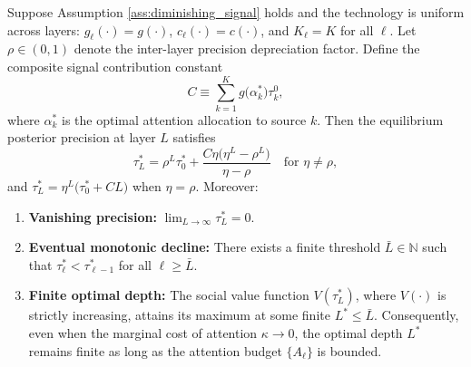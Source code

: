 
\begin{proposition}\label{prop:finite_depth}
Suppose Assumption \ref{ass:diminishing_signal} holds and the technology is uniform across layers: $g_{\ell}(\cdot) = g(\cdot)$, $c_{\ell}(\cdot) = c(\cdot)$, and $K_{\ell} = K$ for all $\ell$. Let $\rho \in (0,1)$ denote the inter-layer precision depreciation factor. Define the composite signal contribution constant
\begin{equation}\label{eq:C_constant}
C \equiv \sum_{k=1}^{K} g\bigl(\alpha^{*}_{k}\bigr) \tau^{0}_{k},
\end{equation}
where $\alpha^{*}_{k}$ is the optimal attention allocation to source $k$. Then the equilibrium posterior precision at layer $L$ satisfies
\begin{equation}\label{eq:tau_star_L}
\tau^{*}_{L} = \rho^{L} \tau^{*}_{0} + \frac{C\eta\bigl(\eta^{L} - \rho^{L}\bigr)}{\eta - \rho} \quad \text{for } \eta \neq \rho,
\end{equation}
and $\tau^{*}_{L} = \eta^{L}\bigl(\tau^{*}_{0} + CL\bigr)$ when $\eta = \rho$. Moreover:
\begin{enumerate}
\item[(i)] \textbf{Vanishing precision:} $\displaystyle \lim_{L \to \infty} \tau^{*}_{L} = 0$.
\item[(ii)] \textbf{Eventual monotonic decline:} There exists a finite threshold $\bar{L} \in \mathbb{N}$ such that $\tau^{*}_{\ell} < \tau^{*}_{\ell-1}$ for all $\ell \geq \bar{L}$.
\item[(iii)] \textbf{Finite optimal depth:} The social value function $V(\tau^{*}_{L})$, where $V(\cdot)$ is strictly increasing, attains its maximum at some finite $L^{*} \leq \bar{L}$. Consequently, even when the marginal cost of attention $\kappa \to 0$, the optimal depth $L^{*}$ remains finite as long as the attention budget $\{A_{\ell}\}$ is bounded.
\end{enumerate}
\end{proposition}

